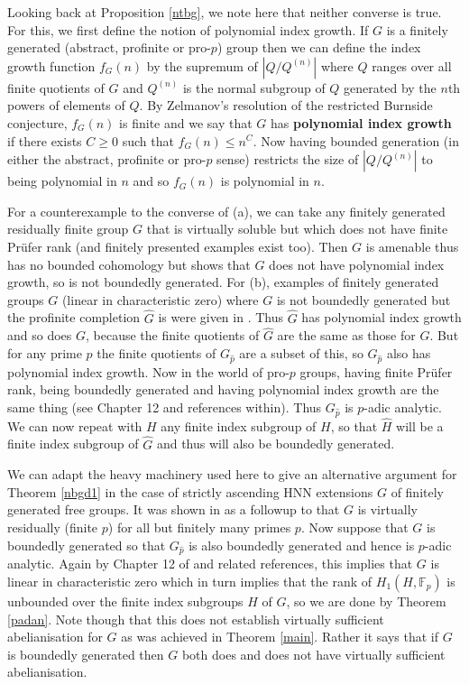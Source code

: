 \documentclass[11pt,reqno]{amsart}
\numberwithin{equation}{section}
\newcommand{\F}{\mathbb{F}}
\newcommand{\leqs}{\leqslant}
\theoremstyle{definition}
\theoremstyle{remark}
\begin{document}
Looking back at Proposition \ref{ntbg}, we note here that neither
converse is true. For this, we first define the notion of polynomial
index growth. If $G$ is a finitely generated (abstract, profinite
or pro-$p$) group then we can define the index growth function $f_G(n)$
by the supremum of $|Q/Q^{(n)}|$ where $Q$ ranges over all finite quotients
of $G$ and $Q^{(n)}$ is the normal subgroup of $Q$ generated by the $n$th
powers of elements of $Q$. By Zelmanov's resolution of the restricted
Burnside conjecture, $f_G(n)$ is finite and we say that $G$ has
{\bf polynomial index growth} if there exists $C\geq 0$ such that
$f_G(n)\leqs n^C$. Now having bounded generation (in either the abstract,
profinite or pro-$p$ sense) restricts the size of $|Q/Q^{(n)}|$ to being
polynomial in $n$ and so $f_G(n)$ is polynomial in $n$.

For a counterexample to the converse of
(a), we can take any finitely generated residually
finite group $G$ that is virtually soluble but which does not have
finite Pr\"ufer rank (and finitely presented examples exist too).
Then $G$ is amenable thus
has no bounded cohomology but \cite{pysg} shows that $G$ does not have
polynomial index growth, so is not boundedly generated. For (b), examples
of finitely generated groups $G$ (linear in characteristic zero) where
$G$ is not boundedly generated but the profinite completion $\hat{G}$
is were given in \cite{invt}. Thus $\hat{G}$ has polynomial index growth
and so does $G$, because the finite quotients of $\hat{G}$ are the same
as those for $G$. But for any prime $p$ the finite quotients of
$G_{\hat{p}}$ are a subset of this, so $G_{\hat{p}}$ also has polynomial
index growth. Now in the world of pro-$p$ groups, having finite Pr\"ufer
rank, being boundedly generated and having polynomial index growth are
the same thing (see \cite{lssg} Chapter 12 and references within). Thus
$G_{\hat{p}}$ is $p$-adic analytic. We can now repeat with $H$ any finite
index subgroup of $H$, so that $\hat{H}$ will be a finite index subgroup
of $\hat{G}$ and thus will also be boundedly  generated.

We can adapt the heavy machinery used here to give an alternative
argument for Theorem \ref{nbgd1} in the case of strictly ascending HNN
extensions $G$ of finitely generated free groups. It was shown in \cite{brsp2}
as a followup to \cite{bs} that $G$ is virtually residually (finite $p$)
for all but finitely many primes $p$. Now suppose that $G$ is boundedly
generated so that $G_{\hat{p}}$ is also boundedly generated and hence
  is $p$-adic analytic.
  Again by Chapter 12 of \cite{lssg} and related references, this implies that
  $G$ is linear in characteristic zero which in turn implies that
  the rank of $H_1(H,\F_p)$ is unbounded over the finite index subgroups
  $H$ of $G$, so we are done by Theorem \ref{padan}. Note though that
  this does not establish virtually sufficient abelianisation for $G$
  as was achieved in Theorem \ref{main}.
  Rather it says that if $G$ is boundedly
  generated then $G$ both does and does not have virtually sufficient
  abelianisation.
  
\end{document}
